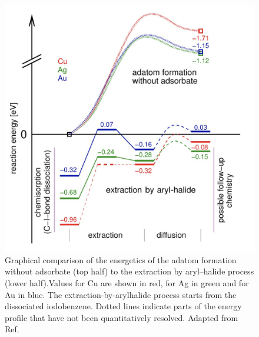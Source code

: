\documentclass[%
 reprint,
 amsmath,amssymb,
 aps,
prb,
floatfix,
]{revtex4-2}
\begin{document}
\begin{figure}[htb]
\centering
\includegraphics[width=0.75\columnwidth]{Fig/Adatom-formation.png}
\caption{Graphical comparison of the energetics of the adatom formation without adsorbate (top half) to the extraction by aryl–halide process (lower half).Values for Cu are shown in red, for Ag in green and for Au in blue. The extraction-by-arylhalide process starts from the dissociated iodobenzene. Dotted lines indicate parts of the energy profile that have not been quantitatively resolved. Adapted from Ref.~\cite{chemeurope2017}}
\label{fig:3}
\end{figure}
\end{document}

